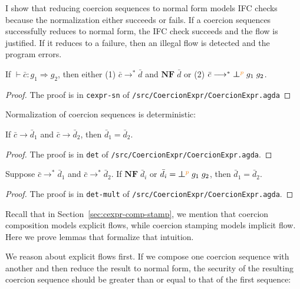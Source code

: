 I show that reducing coercion sequences to normal form models IFC checks because
the normalization either succeeds or fails. If a coercion sequences successfully
reduces to normal form, the IFC check succeeds and the flow is justified. If it
reduces to a failure, then an illegal flow is detected and the program errors.

\begin{lemma}
If $\vdash \bar{c} : g_1 \Rightarrow g_2$, then either
(1) $\bar{c} \longrightarrow^{*} \bar{d}$ and $\mathbf{NF}\;\bar{d}$ or
(2) $\bar{c} \longrightarrow^{*} \err{g_1}{g_2}{p}$.
\end{lemma}
\begin{proof}
  The proof is in \texttt{cexpr-sn} of
  \texttt{/src/CoercionExpr/CoercionExpr.agda}
\end{proof}

\noindent Normalization of coercion sequences is deterministic:

\begin{lemma}
If $\bar{c} \longrightarrow \bar{d}_1$ and $\bar{c} \longrightarrow \bar{d}_2$,
then $\bar{d}_1 = \bar{d}_2$.
\end{lemma}
\begin{proof}
  The proof is in \texttt{det} of \texttt{/src/CoercionExpr/CoercionExpr.agda}.
\end{proof}

\begin{lemma}
Suppose $\bar{c} \longrightarrow^{*} \bar{d}_1$
and $\bar{c} \longrightarrow^{*} \bar{d}_2$.
If $\mathbf{NF}\;\bar{d}_i$ or $\bar{d}_i = \err{g_1}{g_2}{p}$,
then $\bar{d}_1 = \bar{d}_2$.
\end{lemma}
\begin{proof}
  The proof is in \texttt{det-mult} of \texttt{/src/CoercionExpr/CoercionExpr.agda}.
\end{proof}

Recall that in Section~\ref{sec:cexpr-comp-stamp}, we mention that coercion
composition models explicit flows, while coercion stamping models implicit flow.
Here we prove lemmas that formalize that intuition.

We reason about explicit flows first. If we compose one coercion
sequence with another and then reduce the result to normal form, the
security of the resulting coercion sequence should be greater than or
equal to that of the first sequence:

